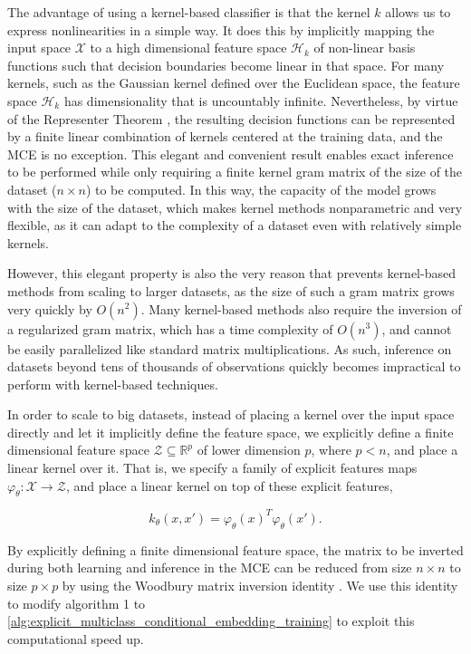 \documentclass{llncs}
\numberwithin{equation}{section}
\numberwithin{table}{section}
\numberwithin{algorithm}{section}
\begin{document}
	The advantage of using a kernel-based classifier is that the kernel $k$ allows us to express nonlinearities in a simple way. It does this by implicitly mapping the input space $\mathcal{X}$ to a high dimensional feature space $\mathcal{H}_{k}$ of non-linear basis functions such that decision boundaries become linear in that space. For many kernels, such as the Gaussian kernel defined over the Euclidean space, the feature space $\mathcal{H}_{k}$ has dimensionality that is uncountably infinite. Nevertheless, by virtue of the Representer Theorem \citep{kimeldorf1971some}, the resulting decision functions can be represented by a finite linear combination of kernels centered at the training data, and the \gls{MCE} is no exception. This elegant and convenient result enables exact inference to be performed while only requiring a finite kernel gram matrix of the size of the dataset ($n \times n$) to be computed. In this way, the capacity of the model grows with the size of the dataset, which makes kernel methods nonparametric and very flexible, as it can adapt to the complexity of a dataset even with relatively simple kernels. 
	
	However, this elegant property is also the very reason that prevents kernel-based methods from scaling to larger datasets, as the size of such a gram matrix grows very quickly by $O(n^{2})$. Many kernel-based methods also require the inversion of a regularized gram matrix, which has a time complexity of $O(n^{3})$, and cannot be easily parallelized like standard matrix multiplications. As such, inference on datasets beyond tens of thousands of observations quickly becomes impractical to perform with kernel-based techniques.
	
	In order to scale to big datasets, instead of placing a kernel over the input space directly and let it implicitly define the feature space, we explicitly define a finite dimensional feature space $\mathcal{Z} \subseteq \mathbb{R}^{p}$ of lower dimension $p$, where $p < n$, and place a linear kernel over it. That is, we specify a family of explicit features maps $\varphi_{\theta} : \mathcal{X} \to \mathcal{Z}$, and place a linear kernel on top of these explicit features,
	
	\begin{equation}
	k_{\theta}(x, x') = \varphi_{\theta}(x)^{T} \varphi_{\theta}(x').
	\end{equation}
	
	By explicitly defining a finite dimensional feature space, the matrix to be inverted during both learning and inference in the \gls{MCE} can be reduced from size $n \times n$ to size $p \times p$ by using the Woodbury matrix inversion identity \citep{higham2002accuracy}. We use this identity to modify algorithm 1 to \cref{alg:explicit_multiclass_conditional_embedding_training} to exploit this computational speed up.
	
\end{document}
